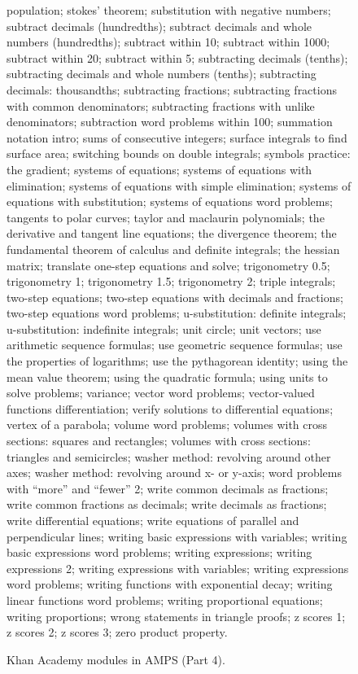 \documentclass{article}
\begin{document}
\begin{figure*}
population; stokes' theorem; substitution with negative numbers; subtract decimals (hundredths); subtract decimals and whole numbers (hundredths); subtract within 10; subtract within 1000; subtract within 20; subtract within 5; subtracting decimals (tenths); subtracting decimals and whole numbers (tenths); subtracting decimals: thousandths; subtracting fractions; subtracting fractions with common denominators; subtracting fractions with unlike denominators; subtraction word problems within 100; summation notation intro; sums of consecutive integers; surface integrals to find surface area; switching bounds on double integrals; symbols practice: the gradient; systems of equations; systems of equations with elimination; systems of equations with simple elimination; systems of equations with substitution; systems of equations word problems; tangents to polar curves; taylor and maclaurin polynomials; the derivative and tangent line equations; the divergence theorem; the fundamental theorem of calculus and definite integrals; the hessian matrix; translate one-step equations and solve; trigonometry 0.5; trigonometry 1; trigonometry 1.5; trigonometry 2; triple integrals; two-step equations; two-step equations with decimals and fractions; two-step equations word problems; u-substitution: definite integrals; u-substitution: indefinite integrals; unit circle; unit vectors; use arithmetic sequence formulas; use geometric sequence formulas; use the properties of logarithms; use the pythagorean identity; using the mean value theorem; using the quadratic formula; using units to solve problems; variance; vector word problems; vector-valued functions differentiation; verify solutions to differential equations; vertex of a parabola; volume word problems; volumes with cross sections: squares and rectangles; volumes with cross sections: triangles and semicircles; washer method: revolving around other axes; washer method: revolving around x- or y-axis; word problems with ``more'' and ``fewer'' 2; write common decimals as fractions; write common fractions as decimals; write decimals as fractions; write differential equations; write equations of parallel and perpendicular lines; writing basic expressions with variables; writing basic expressions word problems; writing expressions; writing expressions 2; writing expressions with variables; writing expressions word problems; writing functions with exponential decay; writing linear functions word problems; writing proportional equations; writing proportions; wrong statements in triangle proofs; z scores 1; z scores 2; z scores 3; zero product property.
    \caption{Khan Academy modules in AMPS (Part 4).}
    \label{fig:khan4}

\end{figure*}
\end{document}
